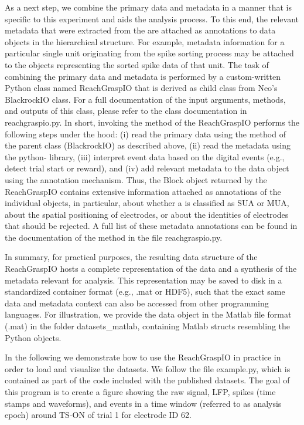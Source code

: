As a next step, we combine the primary data and metadata in a manner that is specific to this experiment and aids the analysis process. To this end, the relevant metadata that were extracted from the  are attached as annotations to data objects in the hierarchical  structure. For example, metadata information for a particular single unit originating from the spike sorting process may be attached to the  objects representing the sorted spike data of that unit. The task of combining the primary data and metadata is performed by a custom-written Python class named ReachGraspIO that is derived as child class from Neo's BlackrockIO class. For a full documentation of the input arguments, methods, and outputs of this class, please refer to the class documentation in reachgraspio.py. In short, invoking the  method of the ReachGraspIO performs the following steps under the hood: (i) read the primary data using the  method of the parent class (BlackrockIO) as described above, (ii) read the metadata using the python- library, (iii) interpret event data based on the digital events (e.g., detect trial start or reward), and (iv) add relevant metadata to the  data object using the annotation mechanism. Thus, the  Block object returned by the ReachGraspIO contains extensive information attached as annotations of the individual  objects, in particular, about whether a  is classified as SUA or MUA, about the spatial positioning of electrodes, or about the identities of electrodes that should be rejected. A full list of these metadata annotations can be found in the documentation of the  method in the file reachgraspio.py.

In summary, for practical purposes, the resulting data structure of the ReachGraspIO hosts a complete representation of the data and a synthesis of the metadata relevant for analysis. This representation may be saved to disk in a standardized container format (e.g., .mat or HDF5), such that the exact same data and metadata context can also be accessed from other programming languages. For illustration, we provide the data object in the Matlab file format (.mat) in the folder datasets\_matlab, containing Matlab structs resembling the Python  objects.

In the following we demonstrate how to use the ReachGraspIO in practice in order to load and visualize the datasets. We follow the file example.py, which is contained as part of the code included with the published datasets. The goal of this program is to create a figure showing the raw signal, LFP, spikes (time stamps and waveforms), and events in a time window (referred to as analysis epoch) around TS-ON of trial 1 for electrode ID 62. 

